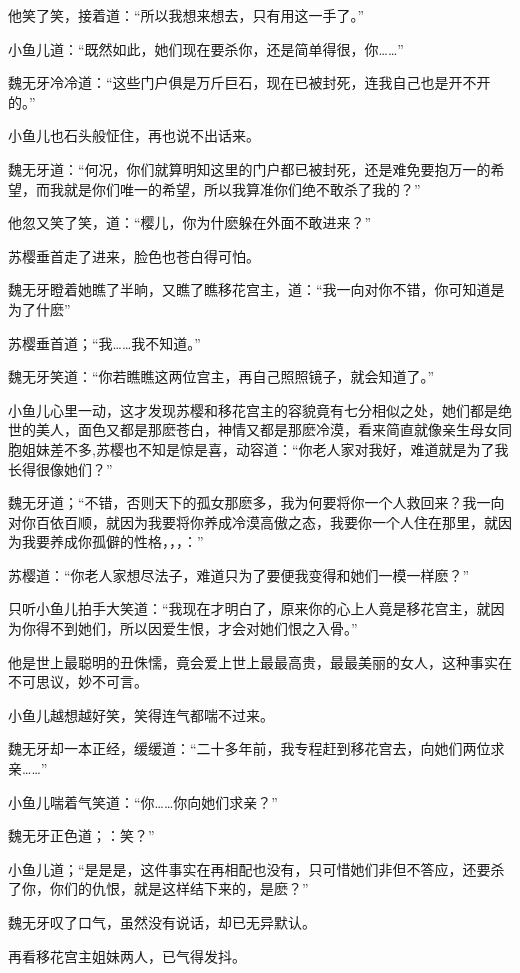 \documentclass[12pt,oneside]{book}
\begin{document}
他笑了笑，接着道：``所以我想来想去，只有用这一手了。''

小鱼儿道：``既然如此，她们现在要杀你，还是简单得很，你\ldots\ldots{}''

魏无牙冷冷道：``这些门户俱是万斤巨石，现在已被封死，连我自己也是开不开的。''

小鱼儿也石头般怔住，再也说不出话来。

魏无牙道：``何况，你们就算明知这里的门户都已被封死，还是难免要抱万一的希望，而我就是你们唯一的希望，所以我算准你们绝不敢杀了我的？''

他忽又笑了笑，道：``樱儿，你为什麽躲在外面不敢进来？''

苏樱垂首走了进来，脸色也苍白得可怕。

魏无牙瞪着她瞧了半晌，又瞧了瞧移花宫主，道：``我一向对你不错，你可知道是为了什麽''

苏樱垂首道；``我\ldots\ldots 我不知道。''

魏无牙笑道：``你若瞧瞧这两位宫主，再自己照照镜子，就会知道了。''

小鱼儿心里一动，这才发现苏樱和移花宫主的容貌竟有七分相似之处，她们都是绝世的美人，面色又都是那麽苍白，神情又都是那麽冷漠，看来简直就像亲生母女同胞姐妹差不多,苏樱也不知是惊是喜，动容道：``你老人家对我好，难道就是为了我长得很像她们？''

魏无牙道；``不错，否则天下的孤女那麽多，我为何要将你一个人救回来？我一向对你百依百顺，就因为我要将你养成冷漠高傲之态，我要你一个人住在那里，就因为我要养成你孤僻的性格，，，：''

苏樱道：``你老人家想尽法子，难道只为了要便我变得和她们一模一样麽？''

只听小鱼儿拍手大笑道：``我现在才明白了，原来你的心上人竟是移花宫主，就因为你得不到她们，所以因爱生恨，才会对她们恨之入骨。''

他是世上最聪明的丑侏懦，竟会爱上世上最最高贵，最最美丽的女人，这种事实在不可思议，妙不可言。

小鱼儿越想越好笑，笑得连气都喘不过来。

魏无牙却一本正经，缓缓道：``二十多年前，我专程赶到移花宫去，向她们两位求亲\ldots\ldots{}''

小鱼儿喘着气笑道：``你\ldots\ldots 你向她们求亲？''

魏无牙正色道；：笑？''

小鱼儿道；``是是是，这件事实在再相配也没有，只可惜她们非但不答应，还要杀了你，你们的仇恨，就是这样结下来的，是麽？''

魏无牙叹了口气，虽然没有说话，却已无异默认。

再看移花宫主姐妹两人，已气得发抖。
\end{document}

